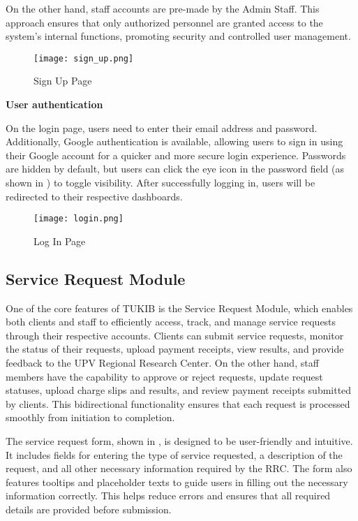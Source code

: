 On the other hand, staff accounts are pre-made by the Admin Staff. This approach ensures that only authorized personnel are granted access to the system’s internal functions, promoting security and controlled user management.

\begin{figure}[h]
	\centering 
	\texttt{[image: sign\_up.png]}
	\caption{Sign Up Page}
	\label{fig:signup_page}
\end{figure}

\textbf{User authentication}

On the login page, users need to enter their email address and password. Additionally, Google authentication is available, allowing users to sign in using their Google account for a quicker and more secure login experience. Passwords are hidden by default, but users can click the eye icon in the password field (as shown in ) to toggle visibility. After successfully logging in, users will be redirected to their respective dashboards.

\newpage

\begin{figure}[h]
	\centering 
	\texttt{[image: login.png]}
	\caption{Log In Page}
	\label{fig:login}
\end{figure}

\subsection{Service Request Module}

One of the core features of TUKIB is the Service Request Module, which enables both clients and staff to efficiently access, track, and manage service requests through their respective accounts. Clients can submit service requests, monitor the status of their requests, upload payment receipts, view results, and provide feedback to the UPV Regional Research Center. On the other hand, staff members have the capability to approve or reject requests, update request statuses, upload charge slips and results, and review payment receipts submitted by clients. This bidirectional functionality ensures that each request is processed smoothly from initiation to completion.

The service request form, shown in , is designed to be user-friendly and intuitive. It includes fields for entering the type of service requested, a description of the request, and all other necessary information required by the RRC. The form also features tooltips and placeholder texts to guide users in filling out the necessary information correctly. This helps reduce errors and ensures that all required details are provided before submission.

